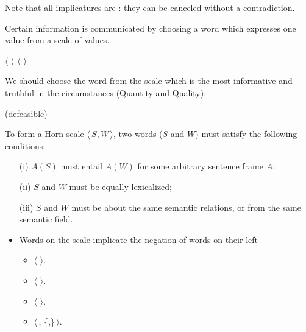 \documentclass[headrule,footrule]{foils}
\begin{document}
Note that all implicatures are : they can be canceled
without a contradiction.

\begin{exe}
  \ex {}
\end{exe}

\newcommand{\horn}[1]{\ensuremath{\langle}\,#1\,\ensuremath{\rangle}}
\newcommand{\set}[1]{\{#1\}}

Certain information is communicated by choosing a word which
expresses one value from a scale of values. 

\begin{exe}
  \ex	$\langle$  $\rangle$
  \ex	$\langle$  $\rangle$
\end{exe}

We should choose the word from the scale which is the most informative
and truthful in the circumstances (Quantity and Quality):

\begin{exe}
  \ex {} \hfill (defeasible)
\end{exe}
 To form a
Horn scale \horn{$S,W$}, two words ($S$ and $W$) must satisfy the following
conditions:
\begin{enumerate}\addtolength{\itemsep}{-2ex}
\item[(i)] $A(S)$ must entail $A(W)$ for some arbitrary sentence frame $A$;
\item[(ii)] $S$ and $W$ must be equally lexicalized;
\item[(iii)] $S$ and $W$ must be about the same semantic relations, or
  from the same semantic field. 
\end{enumerate}
  \begin{itemize}
\item Words on the scale implicate the negation of words on their left
  \begin{itemize}
  \item \horn{}.
  \item \horn{}.
  \item \horn{}.
  \item \horn{,  \set{,}}.
  \end{itemize}
\end{itemize}
\end{document}
